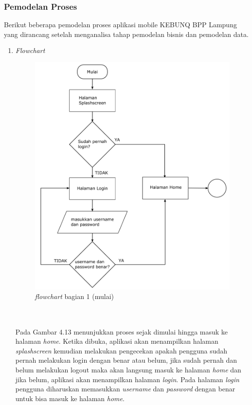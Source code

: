 \begin{flushleft}
\begin{justify}
        \subsubsection{Pemodelan Proses}
        Berikut beberapa pemodelan proses aplikasi mobile KEBUNQ BPP Lampung yang dirancang setelah menganalisa tahap pemodelan bisnis dan 
            pemodelan data.
        \begin{enumerate}[label=\alph*.]
            \item \emph{Flowchart}\\
            \begin{figure}[ht]
                \centering
                \includegraphics[width=12cm]{images/bab 4/fc 1.png}
                \caption{\textit{flowchart} bagian 1 (mulai)}
            \end{figure}
            \vspace{12cm}
            \\\\Pada Gambar 4.13 menunjukkan proses  sejak dimulai hingga masuk ke halaman \emph{home}. Ketika dibuka, aplikasi akan menampilkan halaman \emph{splashscreen} kemudian melakukan pengecekan apakah pengguna sudah pernah
            melakukan login dengan benar atau belum, jika sudah pernah dan belum melakukan logout maka akan langsung masuk ke halaman \emph{home} dan jika belum, aplikasi akan menampilkan halaman \emph{login}. Pada halaman \emph{login} pengguna diharuskan memasukkan \emph{username} dan \emph{password} dengan benar untuk bisa masuk ke halaman \emph{home}.

\end{enumerate}
\end{justify}
\end{flushleft}
